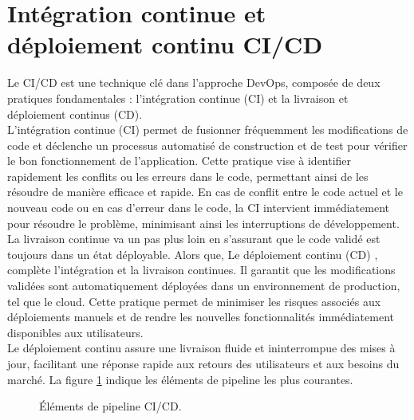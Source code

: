 \section{Intégration continue et déploiement continu CI/CD}

Le CI/CD est une technique clé dans l'approche DevOps, composée de deux pratiques fondamentales : l'intégration continue (CI) et la livraison et déploiement continus (CD).\\
L'intégration continue (CI) \cite{moronval2020} permet de fusionner fréquemment les modifications de code et déclenche un processus automatisé de construction et de test pour vérifier le bon fonctionnement de l'application. Cette pratique vise à identifier rapidement les conflits ou les erreurs dans le code, permettant ainsi de les résoudre de manière efficace et rapide. En cas de conflit entre le code actuel et le nouveau code ou en cas d'erreur dans le code, la CI intervient immédiatement pour résoudre le problème, minimisant ainsi les interruptions de développement. \\
La livraison continue va un pas plus loin en s'assurant que le code validé est toujours dans un état déployable. Alors que, Le déploiement continu (CD) \cite{crochetdamais2023}, complète l'intégration et la livraison continues. Il garantit que les modifications validées sont automatiquement déployées dans un environnement de production, tel que le cloud. Cette pratique permet de minimiser les risques associés aux déploiements manuels et de rendre les nouvelles fonctionnalités immédiatement disponibles aux utilisateurs.\\
Le déploiement continu assure une livraison fluide et ininterrompue des mises à jour, facilitant une réponse rapide aux retours des utilisateurs et aux besoins du marché. La figure \ref{fig:cid} \cite{veritis2024} indique les éléments de pipeline les plus courantes.
        \begin{figure}[H]
        \centering
        \caption{Éléments de pipeline CI/CD.}
        \label{fig:cid}
        \end{figure}

